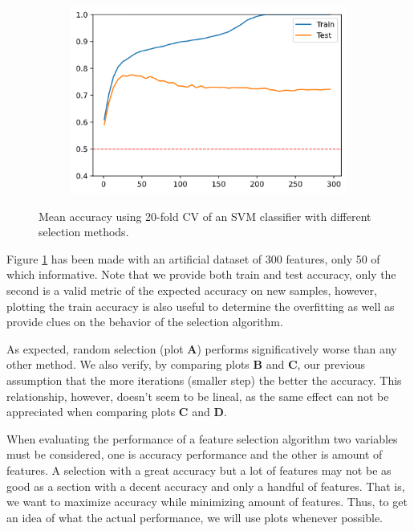 \begin{figure}[h]
\begin{subfigure}[b]{0.4\linewidth}
    \end{subfigure}
    \begin{subfigure}[b]{0.4\linewidth}
        \includegraphics[width=\linewidth]{img/ch4/vanilla300-svmrfe.png}
    \end{subfigure}
    \caption[Comparison of feature selection by method]{Mean accuracy using 20-fold CV of an SVM classifier with different selection methods.}
    \label{fig:ch4.dynamicStep.vanilla.comp}
\end{figure}

Figure \ref{fig:ch4.dynamicStep.vanilla.comp} has been made with an artificial dataset of 300 features, only 50 of which informative. Note that we provide both train and test accuracy, only the second is a valid metric of the expected accuracy on new samples, however, plotting the train accuracy is also useful to determine the overfitting as well as provide clues on the behavior of the selection algorithm.

As expected, random selection (plot \textbf{A}) performs significatively worse than any other method. We also verify, by comparing plots \textbf{B} and \textbf{C}, our previous assumption that the more iterations (smaller step) the better the accuracy. This relationship, however, doesn't seem to be lineal, as the same effect can not be appreciated when comparing plots \textbf{C} and \textbf{D}.

When evaluating the performance of a feature selection algorithm two variables must be considered, one is accuracy performance and the other is amount of features. A selection with a great accuracy but a lot of features may not be as good as a section with a decent accuracy and only a handful of features. That is, we want to maximize accuracy while minimizing amount of features. Thus, to get an idea of what the actual performance, we will use plots whenever possible.

